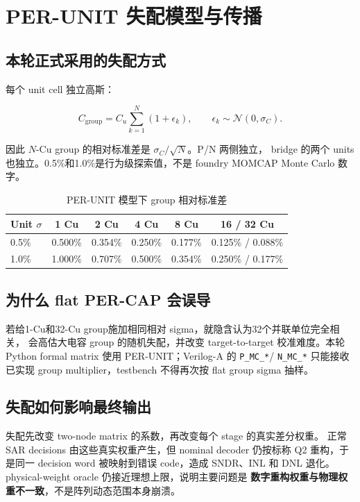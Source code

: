 \documentclass[UTF8,11pt,a4paper]{ctexart}
\newcommand{\code}[1]{\texttt{\small #1}}
\newcommand{\keyterm}[1]{\textbf{\color{DeepNavy}#1}}
\newcommand{\tablehead}{\rowcolor{PaleBlue}\bfseries\sffamily\color{DeepNavy}}
\begin{document}
\section[PER-UNIT 失配]{PER-UNIT 失配模型与传播}

\subsection{本轮正式采用的失配方式}

每个 unit cell 独立高斯：

\[
  C_{\mathrm{group}}
  =
  C_u\sum_{k=1}^{N}(1+\epsilon_k),
  \qquad
  \epsilon_k\sim\mathcal{N}(0,\sigma_C).
\]

因此 $N$-Cu group 的相对标准差是 $\sigma_C/\sqrt{N}$。P/N 两侧独立，
bridge 的两个 units 也独立。0.5\%和1.0\%是行为级探索值，不是 foundry
MOMCAP Monte Carlo 数字。

\begin{table}[htbp]
  \centering
  \caption{PER-UNIT 模型下 group 相对标准差}
  \begin{tabular}{@{}lccccc@{}}
    \toprule
    \tablehead Unit $\sigma$ & 1 Cu & 2 Cu & 4 Cu & 8 Cu & 16 / 32 Cu\\
    \midrule
    0.5\% & 0.500\% & 0.354\% & 0.250\% & 0.177\% & 0.125\% / 0.088\%\\
    1.0\% & 1.000\% & 0.707\% & 0.500\% & 0.354\% & 0.250\% / 0.177\%\\
    \bottomrule
  \end{tabular}
\end{table}

\subsection{为什么 flat PER-CAP 会误导}

若给1-Cu和32-Cu group施加相同相对 sigma，就隐含认为32个并联单位完全相关，
会高估大电容 group 的随机失配，并改变 target-to-target 校准难度。本轮
Python formal matrix 使用 PER-UNIT；Verilog-A 的 \code{P\_MC\_*}/
\code{N\_MC\_*} 只能接收已实现 group multiplier，testbench 不得再次按
flat group sigma 抽样。

\subsection{失配如何影响最终输出}

失配先改变 two-node matrix 的系数，再改变每个 stage 的真实差分权重。
正常 SAR decisions 由这些真实权重产生，但 nominal decoder 仍按标称 Q2
重构，于是同一 decision word 被映射到错误 code，造成 SNDR、INL 和 DNL
退化。physical-weight oracle 仍接近理想上限，说明主要问题是
\keyterm{数字重构权重与物理权重不一致}，不是阵列动态范围本身崩溃。
\end{document}
